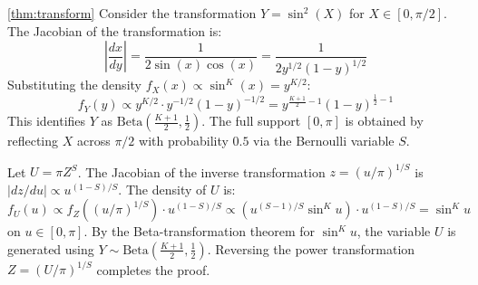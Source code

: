     \begin{proofof}{\autoref{thm:transform}}
Consider the transformation $Y = \sin^2(X)$ for $X \in [0, \pi/2]$. The Jacobian of the transformation is:
\begin{equation}
\left| \frac{dx}{dy} \right| = \frac{1}{2\sin(x)\cos(x)} = \frac{1}{2y^{1/2}(1-y)^{1/2}}
\end{equation}
Substituting the density $f_X(x) \propto \sin^K(x) = y^{K/2}$:
\begin{equation}
f_Y(y) \propto y^{K/2} \cdot y^{-1/2}(1-y)^{-1/2} = y^{\frac{K+1}{2} - 1}(1-y)^{\frac{1}{2} - 1}
\end{equation}
This identifies $Y$ as $\text{Beta}\left(\frac{K+1}{2}, \frac{1}{2}\right)$. The full support $[0, \pi]$ is obtained by reflecting $X$ across $\pi/2$ with probability $0.5$ via the Bernoulli variable $S$.

Let $U = \pi Z^S$. The Jacobian of the inverse transformation $z = (u/\pi)^{1/S}$ is $|dz/du| \propto u^{(1-S)/S}$. The density of $U$ is:
\begin{equation}
f_U(u) \propto f_Z((u/\pi)^{1/S}) \cdot u^{(1-S)/S} \propto (u^{(S-1)/S} \sin^K u) \cdot u^{(1-S)/S} = \sin^K u
\end{equation}
on $u \in [0, \pi]$. By the Beta-transformation theorem for $\sin^K u$, the variable $U$ is generated using $Y \sim \text{Beta}(\frac{K+1}{2}, \frac{1}{2})$. Reversing the power transformation $Z = (U/\pi)^{1/S}$ completes the proof.
\end{proofof}



